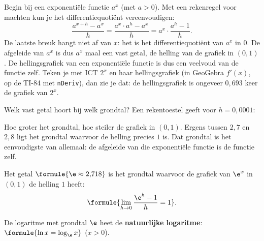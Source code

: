 Begin bij een exponentiële functie $a^x$ (met $a > 0$). Met een rekenregel voor machten kun je het differentiequotiënt vereenvoudigen:
\[\frac{a^{x + h} - a^x}{h} = \frac{a^x \cdot a^h - a^x}{h} = a^x \cdot \frac{a^h - 1}{h} .\]
De laatste breuk hangt niet af van $x$: het is het differentiequotiënt van $a^x$ in $0$. De afgeleide van $a^x$ is dus $a^x$ maal een vast getal, de helling van de grafiek in $(0, 1)$. De hellingsgrafiek van een exponentiële functie is dus een veelvoud van de functie zelf. Teken je met ICT $2^x$ en haar hellingsgrafiek (in GeoGebra $f'(x)$, op de TI-84 met \texttt{nDeriv}), dan zie je dat: de hellingsgrafiek is ongeveer $0{,}693$ keer de grafiek van $2^x$.

Welk vast getal hoort bij welk grondtal? Een rekentoestel geeft voor $h = 0{,}0001$:


Hoe groter het grondtal, hoe steiler de grafiek in $(0, 1)$. Ergens tussen $2{,}7$ en $2{,}8$ ligt het grondtal waarvoor de helling precies $1$ is. Dat grondtal is het eenvoudigste van allemaal: de afgeleide van die exponentiële functie is de functie zelf.

\begin{theorie}
Het getal $\formule{\e \approx 2{,}718}$ is het grondtal waarvoor de grafiek van $\e^x$ in $(0, 1)$ de helling $1$ heeft:
\[\formule{\lim_{h \to 0} \frac{\e^h - 1}{h} = 1}.\]

De logaritme met grondtal $\e$ heet de \textbf{\textcolor{accent}{natuurlijke logaritme}}: \quad $\formule{\ln x = \log_\e x}$ \quad ($x > 0$).
\end{theorie}


